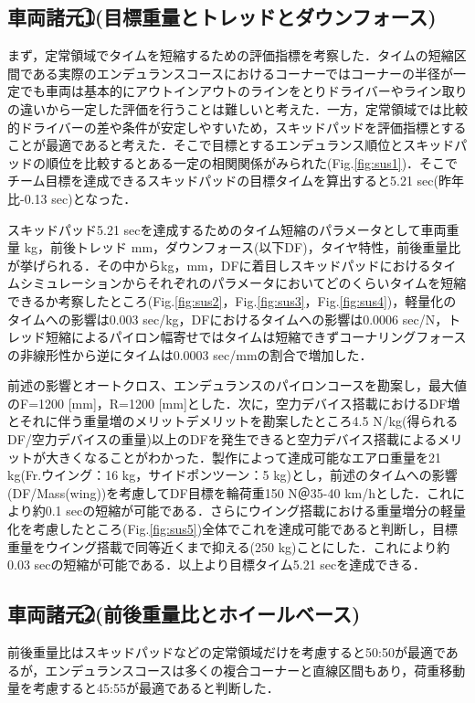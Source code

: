 \subsection{車両諸元\textcircled{\scriptsize1}(目標重量とトレッドとダウンフォース)}
まず，定常領域でタイムを短縮するための評価指標を考察した．タイムの短縮区間である実際のエンデュランスコースにおけるコーナーではコーナーの半径が一定でも車両は基本的にアウトインアウトのラインをとりドライバーやライン取りの違いから一定した評価を行うことは難しいと考えた．一方，定常領域では比較的ドライバーの差や条件が安定しやすいため，スキッドパッドを評価指標とすることが最適であると考えた．そこで目標とするエンデュランス順位とスキッドパッドの順位を比較するとある一定の相関関係がみられた(Fig.\ref{fig:sus1})．そこでチーム目標を達成できるスキッドパッドの目標タイムを算出すると5.21 sec(昨年比-0.13 sec)となった．

スキッドパッド5.21 secを達成するためのタイム短縮のパラメータとして車両重量 kg，前後トレッド mm，ダウンフォース(以下DF)，タイヤ特性，前後重量比が挙げられる．その中からkg，mm，DFに着目しスキッドパッドにおけるタイムシミュレーションからそれぞれのパラメータにおいてどのくらいタイムを短縮できるか考察したところ(Fig.\ref{fig:sus2}，Fig.\ref{fig:sus3}，Fig.\ref{fig:sus4})，軽量化のタイムへの影響は0.003 sec/kg，DFにおけるタイムへの影響は0.0006 sec/N，トレッド短縮によるパイロン幅寄せではタイムは短縮できずコーナリングフォースの非線形性から逆にタイムは0.0003 sec/mmの割合で増加した．

前述の影響とオートクロス、エンデュランスのパイロンコースを勘案し，最大値のF=1200 [mm]，R=1200 [mm]とした．次に，空力デバイス搭載におけるDF増とそれに伴う重量増のメリットデメリットを勘案したところ4.5 N/kg(得られるDF/空力デバイスの重量)以上のDFを発生できると空力デバイス搭載によるメリットが大きくなることがわかった．製作によって達成可能なエアロ重量を21 kg(Fr.ウイング：16 kg，サイドポンツーン：5 kg)とし，前述のタイムへの影響(DF/Mass(wing))を考慮してDF目標を輪荷重150 N＠35-40 km/hとした．これにより約0.1 secの短縮が可能である．さらにウイング搭載における重量増分の軽量化を考慮したところ(Fig.\ref{fig:sus5})全体でこれを達成可能であると判断し，目標重量をウイング搭載で同等近くまで抑える(250 kg)ことにした．これにより約0.03 secの短縮が可能である．以上より目標タイム5.21 secを達成できる．

\subsection{車両諸元\textcircled{\scriptsize2}(前後重量比とホイールベース)}
前後重量比はスキッドパッドなどの定常領域だけを考慮すると50:50が最適であるが，エンデュランスコースは多くの複合コーナーと直線区間もあり，荷重移動量を考慮すると45:55が最適であると判断した．

